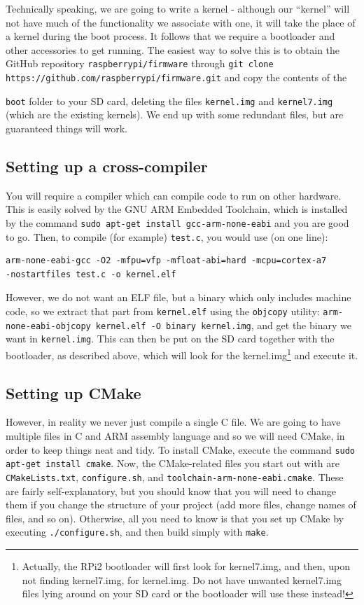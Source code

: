 \documentclass[a4paper,11pt,reqno]{amsart}
\begin{document}
Technically speaking, we are going to write a kernel - although our ``kernel'' will not have much of the functionality we associate with one, it will take the place of a kernel during the boot process. It follows that we require a bootloader and other accessories to get running. The easiest way to solve this is to obtain the GitHub repository \texttt{raspberrypi/firmware} through \texttt{git clone https://github.com/raspberrypi/firmware.git} and copy the contents of the {\texttt{boot} folder to your SD card, deleting the files \texttt{kernel.img} and \texttt{kernel7.img} (which are the existing kernels). We end up with some redundant files, but are guaranteed things will work.

\subsection{Setting up a cross-compiler}
You will require a compiler which can compile code to run on other hardware. This is easily solved by the GNU ARM Embedded Toolchain, which is installed by the command \texttt{sudo apt-get install gcc-arm-none-eabi} and you are good to go. Then, to compile (for example) \texttt{test.c}, you would use (on one line):

\begin{verbatim}
arm-none-eabi-gcc -O2 -mfpu=vfp -mfloat-abi=hard -mcpu=cortex-a7 
-nostartfiles test.c -o kernel.elf
\end{verbatim}

However, we do not want an ELF file, but a binary which only includes machine code, so we extract that part from \texttt{kernel.elf} using the \texttt{objcopy} utility: \texttt{arm-none-eabi-objcopy kernel.elf -O binary kernel.img}, and get the binary we want in \texttt{kernel.img}. This can then be put on the SD card together with the bootloader, as described above, which will look for the kernel.img\footnote{Actually, the RPi2 bootloader will first look for kernel7.img, and then, upon not finding kernel7.img, for kernel.img. Do not have unwanted kernel7.img files lying around on your SD card or the bootloader will use these instead!} and execute it.

\subsection{Setting up CMake}
However, in reality we never just compile a single C file. We are going to have multiple files in C and ARM assembly language and so we will need CMake, in order to keep things neat and tidy. To install CMake, execute the command \texttt{sudo apt-get install cmake}. Now, the CMake-related files you start out with are \texttt{CMakeLists.txt}, \texttt{configure.sh}, and \texttt{toolchain-arm-none-eabi.cmake}. These are fairly self-explanatory, but you should know that you will need to change them if you change the structure of your project (add more files, change names of files, and so on). Otherwise, all you need to know is that you set up CMake by executing \texttt{./configure.sh}, and then build simply with \texttt{make}. 

}
\end{document}
